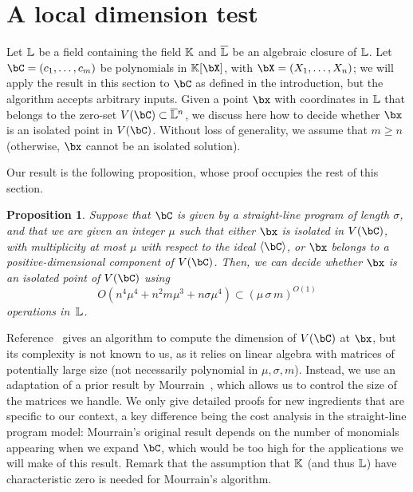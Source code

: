 \documentclass[12pt]{article}
\newtheorem{proposition}[definition]{Proposition}
\begin{document}

\section{A local dimension test} \label{sec:isolated}

Let $\mathbb{L}$ be a field containing the field $\mathbb{K}$ and $\overline{\mathbb{L}}$ be an
algebraic closure of $\mathbb{L}$.  Let $\bC=(c_1,\dots,c_m)$ be polynomials
in $\KK[\bX]$, with $\bX=(X_1,\dots,X_n)$; we will apply the result in
this section to $\bC$ as defined in the introduction, but the
algorithm accepts arbitrary inputs. Given a point $\bx$ with
coordinates in $\mathbb{L}$ that belongs to the zero-set $V(\bC)\subset
\LLbar{}^n$, we discuss here how to decide whether $\bx$ is an
isolated point in $V(\bC)$.  Without loss of generality, we assume
that $m\ge n$ (otherwise, $\bx$ cannot be an isolated solution).

Our result is the following proposition, whose proof occupies the rest
of this section.
\begin{proposition}\label{prop:testisolated}
  Suppose that $\bC$ is given by a straight-line program of length
  $\sigma$, and that we are given an integer $\mu$ such that
  either $\bx$ is isolated in $V(\bC)$, with multiplicity at most
  $\mu$ with respect to the ideal $\langle \bC\rangle$, or $\bx$
  belongs to a positive-dimensional component of $V(\bC)$.
  Then, we can decide whether $\bx$ is an isolated point of $V(\bC)$
  using
$$O(n^4 \mu^4 + n^2 m \mu^3 + n \sigma \mu^4) \subset (\mu\,\sigma\,m)^{O(1)}$$ operations in~$\mathbb{L}$.
\end{proposition}
Reference~\cite{BaHaPeSo09} gives an algorithm to compute the
dimension of $V(\bC)$ at $\bx$, but its complexity is not known to us,
as it relies on linear algebra with matrices of potentially large size
(not necessarily polynomial in $\mu,\sigma,m$).  Instead, we use an
adaptation of a prior result by Mourrain~\cite{Mourrain97}, which
allows us to control the size of the matrices we handle. We only give
detailed proofs for new ingredients that are specific to our context,
a key difference being the cost analysis in the straight-line program
model: Mourrain's original result depends on the number of monomials
appearing when we expand $\bC$, which would be too high for the
applications we will make of this result. Remark that the assumption
that $\mathbb{K}$ (and thus $\mathbb{L}$) have characteristic zero is needed for 
Mourrain's algorithm.
\end{document}
